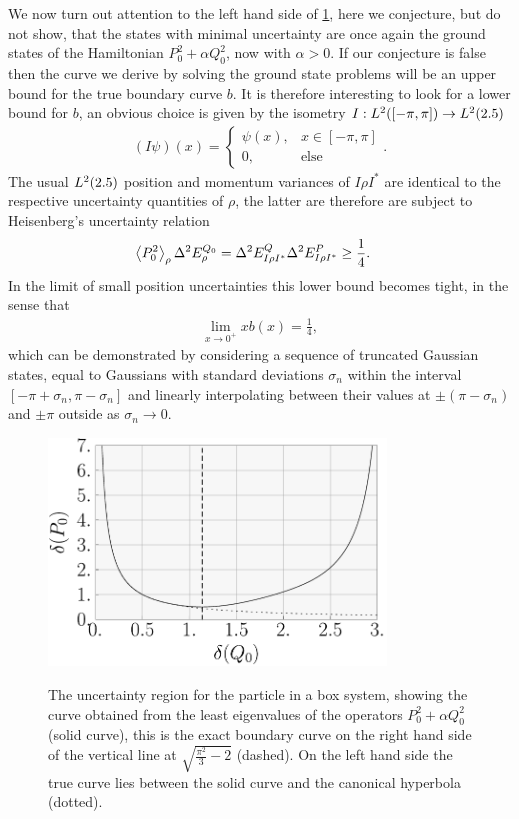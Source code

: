 We now turn out attention to the left hand side of \ref{fig:box-ur}, here we conjecture, but do not show, that the states with minimal uncertainty are once again the ground states of the Hamiltonian $P_0^2 + \alpha Q_0^2$, now with $\alpha >0$. If our conjecture is false then the curve we derive by solving the ground state problems will be an upper bound for the true boundary curve $b$. It is therefore interesting to look for a lower bound for $b$, an obvious choice is given by the isometry $I:L^2([-\pi,\pi])\to L^2(2.5)$
\begin{align}
  (I\psi)(x) = \begin{cases}\psi(x),&x\in [-\pi,\pi]\\ 0, &\text{else}\end{cases}.
\end{align}
The usual $L^2(2.5)$ position and momentum variances of $I\rho I^{*}$ are identical to the respective uncertainty quantities of $\rho$, the latter are therefore are subject to Heisenberg's  uncertainty relation
\begin{align}
  \expe{P_0^2}{\rho} \var{E^{Q_0}_{\rho}} &= \var{E^{Q}_{I\rho I^{*}}} \var{E^{P}_{I\rho I^{*}}} \geq \frac{1}{4}.
\end{align}
In the limit of small position uncertainties this lower bound becomes tight, in the sense that
\begin{align}
  \lim_{x\to 0^{+}} x b(x) = \frac{1}{4},
\end{align}
which can be demonstrated by considering a sequence of truncated Gaussian states, equal to Gaussians with standard deviations $\sigma_n$ within the interval $[-\pi+\sigma_n, \pi-\sigma_n]$ and linearly interpolating between their values at $\pm (\pi-\sigma_n)$ and $\pm \pi$ outside as $\sigma_n \to 0$.

\begin{figure}
  \begin{center}
    \includegraphics[width=0.8\textwidth]{box-ur}
    \label{fig:box-ur}
  \end{center}
  \caption{The uncertainty region for the particle in a box system, showing the curve obtained from the least eigenvalues of the operators $P_0^2 + \alpha Q_0^2$ (solid curve), this is the exact boundary curve on the right hand side of the vertical line at $\sqrt{\frac{\pi^2}{3} -2}$ (dashed). On the left hand side the true curve lies between the solid curve and the canonical hyperbola (dotted). }
\end{figure}

